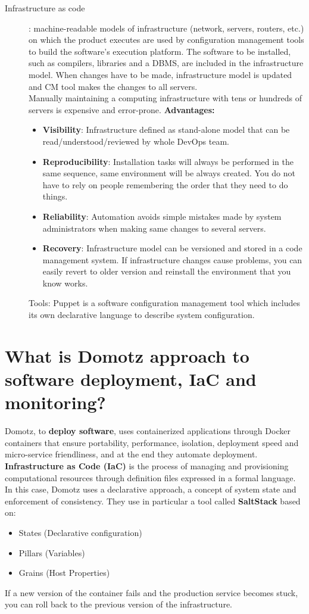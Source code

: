 \begin{description}
   \item[Infrastructure as code]: machine-readable models of infrastructure (network, servers, routers, etc.) on which the product executes are used by configuration management tools to build the software’s execution platform. The software to be installed, such as compilers, libraries and a DBMS, are included in the infrastructure model.
   When changes have to be made, infrastructure model is updated and CM tool makes the changes to all servers.\\
   Manually maintaining a computing infrastructure with tens or hundreds of servers is expensive and error-prone.
      \textbf{Advantages:}
      \begin{itemize}
         \item \textbf{Visibility}: Infrastructure defined as stand-alone model that can be read/understood/reviewed by whole DevOps team.
         \item \textbf{Reproducibility}: Installation tasks will always be performed in the same sequence, same environment will be always created. You do not have to rely on people remembering the order that they need to do things.
         \item \textbf{Reliability}: Automation avoids simple mistakes made by system administrators when making same changes to several servers.
         \item \textbf{Recovery}: Infrastructure model can be versioned and stored in a code management system. If infrastructure changes cause problems, you can easily revert to older version and reinstall the environment that you know works.
      \end{itemize}
      Tools: Puppet is a software configuration management tool which includes its own declarative language to describe system configuration.
\end{description}

\section{What is Domotz approach to software deployment, IaC and monitoring?}
Domotz, to \textbf{deploy software}, uses containerized applications through Docker containers that ensure portability, performance, isolation, deployment speed and micro-service friendliness, and at the end they automate deployment. \nl
\textbf{Infrastructure as Code (IaC)} is the process of managing and provisioning computational resources through definition files expressed in a formal language. In this case, Domotz uses a declarative approach, a concept of system state and enforcement of consistency. They use in particular a tool called \textbf{SaltStack} based on:
\begin{itemize}
   \item States (Declarative configuration)
   \item Pillars (Variables)
   \item Grains (Host Properties)
\end{itemize}
If a new version of the container fails and the production service becomes stuck, you can roll back to the previous version of the infrastructure.

